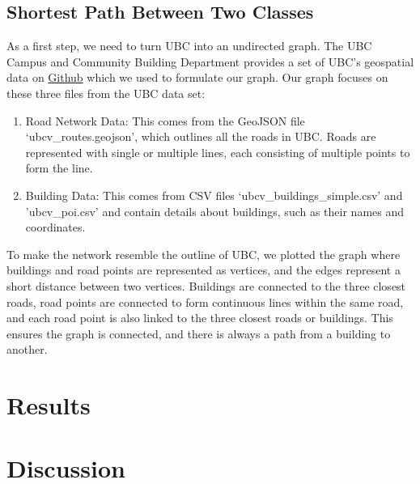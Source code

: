 \documentclass[12pt]{report}
\begin{document}
\subsection{Shortest Path Between Two Classes}
As a first step, we need to turn UBC into an undirected graph. The UBC Campus and Community Building Department provides a set of UBC’s geospatial data on \href{https://github.com/UBCGeodata/ubc-geospatial-opendata}{Github} which we used to formulate our graph. Our graph focuses on these three files from the UBC data set:   
\begin{enumerate}
    \item Road Network Data: This comes from the GeoJSON file `ubcv\_routes.geojson', which outlines all the roads in UBC. Roads are represented with single or multiple lines, each consisting of multiple points to form the line. 
    \item Building Data: This comes from CSV files `ubcv\_buildings\_simple.csv' and 'ubcv\_poi.csv' and contain details about buildings, such as their names and coordinates.
\end{enumerate}
To make the network resemble the outline of UBC, we plotted the graph where buildings and road points are represented as vertices, and the edges represent a short distance between two vertices. Buildings are connected to the three closest roads, road points are connected to form continuous lines within the same road, and each road point is also linked to the three closest roads or buildings. This ensures the graph is connected, and there is always a path from a building to another. 
\section{Results}

\section{Discussion}



\end{document}
